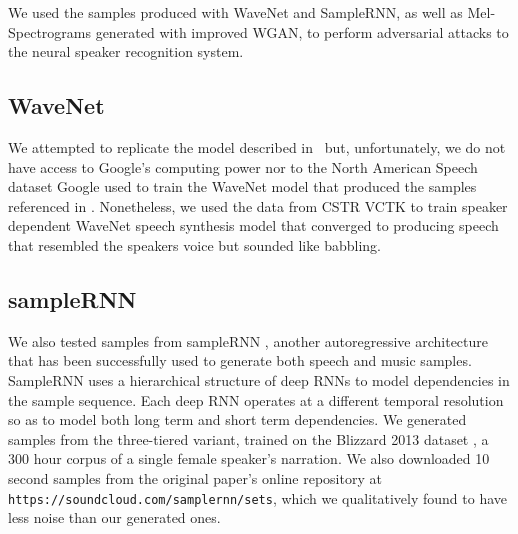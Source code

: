 We used the samples produced with WaveNet and SampleRNN, as well as Mel-Spectrograms generated with improved WGAN, to perform adversarial attacks to the neural speaker recognition system. 

\subsection{WaveNet} %
\label{sub:res-WaveNet}
We attempted to replicate the model described in~\cite{van2016wavenet} but, unfortunately, we do not have access to Google's computing power nor to the North American Speech dataset Google used to train the WaveNet model that produced the samples referenced in \cite{van2016wavenet}. Nonetheless, we used the data from CSTR VCTK to train speaker dependent WaveNet speech synthesis model that converged to producing speech that resembled the speakers voice but sounded like babbling.
\subsection{sampleRNN} %
\label{sub:samplernn}
We also tested samples from sampleRNN \cite{mehri2016samplernn}, another autoregressive architecture that has been successfully used to generate both speech and music samples. SampleRNN uses a hierarchical structure of deep RNNs to model dependencies in the sample sequence. Each deep RNN operates at a different temporal resolution so as to model both long term and short term dependencies. We generated samples from the three-tiered variant, trained on the Blizzard 2013 dataset \cite{prahallad2013blizzard}, a 300 hour corpus of a single female speaker's narration. We also downloaded 10 second samples from the original paper's online repository at \texttt{https://soundcloud.com/samplernn/sets}, which we qualitatively found to have less noise than our generated ones. 
